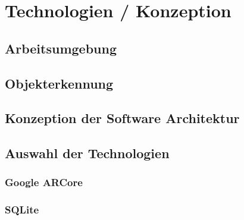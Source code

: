 
\chapter{Technologien / Konzeption}
\section{Arbeitsumgebung}
\section{Objekterkennung}
\section{Konzeption der Software Architektur}
\section{Auswahl der Technologien}
\subsection{Google ARCore}
\subsection{SQLite}